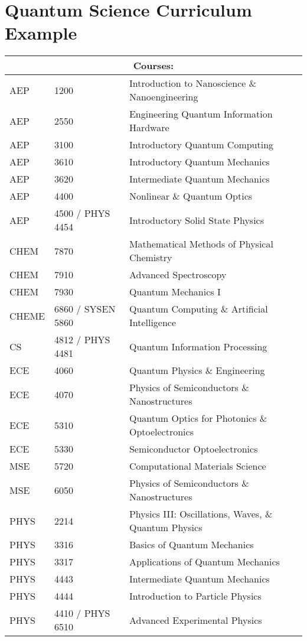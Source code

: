 \chapter{\LARGE{Quantum Science Curriculum Example}}

{
\normalsize\begin{tabular}{ |p{1.5cm}||p{3cm}|p{9cm}| }
 \hline
 \multicolumn{3}{|c|}{Courses:} \\
 \hline
AEP & 1200 & Introduction to Nanoscience \& Nanoengineering\\
AEP & 2550 & Engineering Quantum Information Hardware\\
AEP & 3100 & Introductory Quantum Computing\\
AEP & 3610 & Introductory Quantum Mechanics\\
AEP & 3620 & Intermediate Quantum Mechanics\\
AEP & 4400 & Nonlinear \& Quantum Optics\\
AEP & 4500 / PHYS 4454 & Introductory Solid State Physics\\
CHEM & 7870 & Mathematical Methods of Physical Chemistry\\
CHEM & 7910 & Advanced Spectroscopy\\
CHEM & 7930 & Quantum Mechanics I\\
CHEME & 6860 / SYSEN 5860 & Quantum Computing \& Artificial Intelligence\\
CS & 4812 / PHYS 4481 & Quantum Information Processing\\
ECE & 4060 & Quantum Physics \& Engineering\\
ECE & 4070 & Physics of Semiconductors \& Nanostructures\\
ECE & 5310 & Quantum Optics for Photonics \& Optoelectronics\\
ECE & 5330 & Semiconductor Optoelectronics\\
MSE & 5720 & Computational Materials Science\\
MSE & 6050 & Physics of Semiconductors \& Nanostructures\\
PHYS & 2214 & Physics III: Oscillations, Waves, \& Quantum Physics\\
PHYS & 3316 & Basics of Quantum Mechanics\\
PHYS & 3317 & Applications of Quantum Mechanics\\
PHYS & 4443 & Intermediate Quantum Mechanics\\
PHYS & 4444 & Introduction to Particle Physics\\
PHYS & 4410 / PHYS 6510 & Advanced Experimental Physics\\

\end{tabular}}
